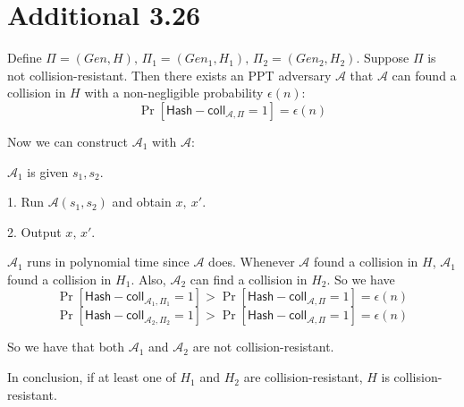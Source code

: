 \documentclass[a4papers]{ctexart}
\newcommand{\mc}[1]{\mathcal{#1}}
\newcommand{\ms}[1]{\mathsf{#1}}
\begin{document}
\section*{Additional 3.26}
Define $\Pi=(Gen,H),\,\Pi_1=(Gen_1,H_1),\,\Pi_2=(Gen_2,H_2)$.
Suppose $\Pi$ is not collision-resistant. Then there exists an PPT adversary $\mc{A}$ 
that $\mc{A}$ can found a collision in $H$ with a non-negligible probability $\epsilon(n)$:
\[ \Pr[\ms{Hash-coll}_{\mc{A},\Pi}=1]=\epsilon(n)\]

Now we can construct $\mc{A}_1$ with $\mc{A}$:

$\mc{A}_1$ is given $s_1,s_2$.

1. Run $\mc{A}(s_1,s_2)$ and obtain $x, \ x'$.

2. Output $x,\,x'$.

$\mc{A}_1$ runs in polynomial time since $\mc{A}$ does. 
Whenever $\mc{A}$ found a collision in $H$, $\mc{A}_1$ found a collision in $H_1$. 
Also, $\mc{A}_2$ can find a collision in $H_2$. So we have 
\[ \Pr[\ms{Hash-coll}_{\mc{A}_1,\Pi_1}=1] > \Pr[\ms{Hash-coll}_{\mc{A},\Pi}=1] = \epsilon(n) \]
\[ \Pr[\ms{Hash-coll}_{\mc{A}_2,\Pi_2}=1] > \Pr[\ms{Hash-coll}_{\mc{A},\Pi}=1] = \epsilon(n) \]

So we have that both $\mc{A}_1$ and $\mc{A}_2$ are not collision-resistant.

In conclusion, if at least one of $H_1$ and $H_2$ are collision-resistant, $H$ is collision-resistant.
\end{document}
